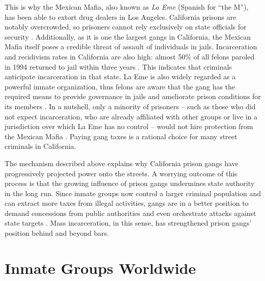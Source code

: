 \documentclass[a4paper, 12pt]{article}
\begin{document}
This is why the Mexican Mafia, also known as \textit{La Eme} (Spanish for ``the M''), has been able to extort drug dealers in Los Angeles. California prisons are notably overcrowded, so prisoners cannot rely exclusively on state officials for security \citep{muradyan2008california,newman2012brown}. Additionally, as it is one the largest gangs in California, the Mexican Mafia itself poses a credible threat of assault of individuals in jails. Incarceration and recidivism rates in California are also high: almost 50\% of all felons paroled in 1994 returned to jail within three years \citep{langan2002recidivism}. This indicates that criminals anticipate incarceration in that state. La Eme is also widely regarded as a powerful inmate organization, thus felons are aware that the gang has the required means to provide governance in jails and ameliorate prison conditions for its members \citep{rafael2013mexican,valdez2005mexican}. In a nutshell, only a minority of prisoners -- such as those who did not expect incarceration, who are already affiliated with other groups or live in a jurisdiction over which La Eme has no control -- would not hire protection from the Mexican Mafia \citep[p. 709--710]{skarbek2011governance}. Paying gang taxes is a rational choice for many street criminals in California.

The mechanism described above explains why California prison gangs have progressively projected power onto the streets. A worrying outcome of this process is that the growing influence of prison gangs undermines state authority in the long run. Since inmate groups now control a larger criminal population and can extract more taxes from illegal activities, gangs are in a better position to demand concessions from public authorities and even orchestrate attacks against state targets \citep{lessing2014build}. Mass incarceration, in this sense, has strengthened prison gangs' position behind and beyond bars.

\section{Inmate Groups Worldwide}
\label{sec:global} 
\end{document}
